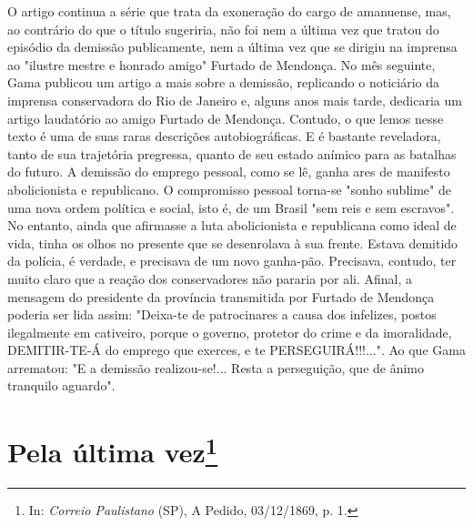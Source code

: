 {\small\noindent
O artigo continua a série que trata da exoneração do cargo de
amanuense, mas, ao contrário do que o título sugeriria, não foi nem a
última vez que tratou do episódio da demissão publicamente, nem a última
vez que se dirigiu na imprensa ao "ilustre mestre e honrado amigo"
Furtado de Mendonça. No mês seguinte, Gama publicou um artigo a mais
sobre a demissão, replicando o noticiário da imprensa conservadora do
Rio de Janeiro e, alguns anos mais tarde, dedicaria um artigo laudatório
ao amigo Furtado de Mendonça. Contudo, o que lemos nesse texto é uma de
suas raras descrições autobiográficas. E é bastante reveladora, tanto de
sua trajetória pregressa, quanto de seu estado anímico para as batalhas
do futuro. A demissão do emprego pessoal, como se lê, ganha ares de
manifesto abolicionista e republicano. O compromisso pessoal torna-se
"sonho sublime" de uma nova ordem política e social, isto é, de um
Brasil "sem reis e sem escravos". No entanto, ainda que afirmasse a luta
abolicionista e republicana como ideal de vida, tinha os olhos no
presente que se desenrolava à sua frente. Estava demitido da polícia, é
verdade, e precisava de um novo ganha-pão. Precisava, contudo, ter muito
claro que a reação dos conservadores não pararia por ali. Afinal, a
mensagem do presidente da província transmitida por Furtado de Mendonça
poderia ser lida assim: "Deixa-te de patrocinares a causa dos infelizes,
postos ilegalmente em cativeiro, porque o governo, protetor do crime e
da imoralidade, DEMITIR-TE-Á do emprego que exerces, e te
PERSEGUIRÁ!!!...". Ao que Gama arrematou: "E a demissão realizou-se!...
Resta a perseguição, que de ânimo tranquilo aguardo".}

\chapter{Pela última vez\footnote[*]{In: \emph{Correio Paulistano}
  (SP), A Pedido, 03/12/1869, p. 1.}}

